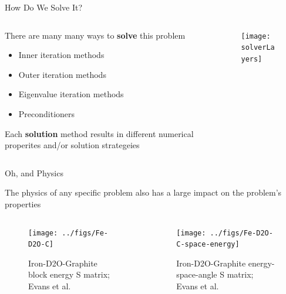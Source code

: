 \documentclass[xcolor=x11names,compress]{beamer}
\renewcommand{\(}{\begin{columns}}
\renewcommand{\)}{\end{columns}}
\newcommand{\<}[1]{\begin{column}{#1}}
\renewcommand{\>}{\end{column}}
\begin{document}
\begin{frame}{How Do We Solve It?}

    \begin{columns}
    \begin{column}{0.4\textwidth}
        There are many many ways to \textbf{\textcolor{dgreen}{solve}} this problem
        \begin{itemize}
        \item Inner iteration methods
        \item Outer iteration methods
       \item Eigenvalue iteration methods
        \item Preconditioners
        \end{itemize}
    
        Each \textbf{\textcolor{dgreen}{solution}} method results in different
       numerical properites and/or solution strategeies
  	\end{column}
 	\begin{column}{0.5\textwidth}
 	   \begin{center}
 	   \begin{figure}
 	   \texttt{[image: solverLayers]}
       \end{figure}
 	   \end{center}
  	\end{column}
	\end{columns}
	
\end{frame}

\begin{frame}{Oh, and Physics}

    The physics of any specific problem also has a large impact on the
    problem's properties
    
    \begin{columns}
    \begin{column}{0.45\textwidth}
 	   \begin{center}
 	   \begin{figure}
 	   \texttt{[image: ../figs/Fe-D2O-C]}
 	   \caption{Iron-D2O-Graphite block energy S matrix; Evans et al.}
       \end{figure}
 	   \end{center}
  	\end{column}
 	\begin{column}{0.45\textwidth}
 	   \begin{center}
 	   \begin{figure}
 	   \texttt{[image: ../figs/Fe-D2O-C-space-energy]}
 	   \caption{Iron-D2O-Graphite energy-space-angle S matrix; Evans et al.}
       \end{figure}
 	   \end{center}
  	\end{column}
	\end{columns}
       
\end{frame}
\end{document}
